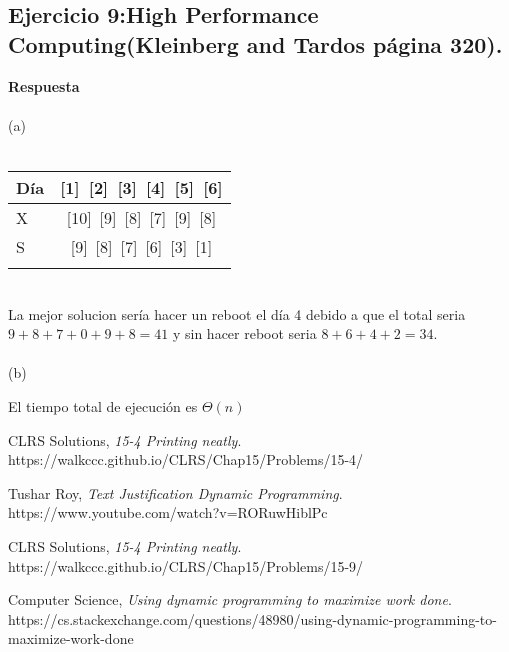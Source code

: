 \documentclass[a4paper,12pt]{article}
\begin{document}
\subsection{Ejercicio 9:High Performance Computing(Kleinberg and Tardos página 320).}
\textbf{Respuesta}\\\\
(a)\\\\
\begin{tabular}{lc}
\hline \hline
 Día & \mbox{[1] [2] [3] [4] [5] [6]} \\\hline
 X & \mbox{[10] [9] [8] [7] [9] [8]}\\
 S & \mbox{[9] [8] [7] [6] [3] [1]}\\
\\
\hline \hline
\end{tabular}\\
La mejor solucion sería hacer un reboot el día 4 debido a que el total seria $9 + 8 + 7 + 0 + 9 + 8 = 41$ y sin hacer reboot seria $8 + 6 + 4 + 2 = 34 $.\\\\
(b)

El tiempo total de ejecución es $\Theta(n)$
\clearpage
\begin{thebibliography}{15}

  CLRS Solutions,
  \emph{15-4 Printing neatly}.\\
  https://walkccc.github.io/CLRS/Chap15/Problems/15-4/

  Tushar Roy,
  \emph{Text Justification Dynamic Programming}.\\
  https://www.youtube.com/watch?v=RORuwHiblPc
  
  CLRS Solutions,
  \emph{15-4 Printing neatly}.\\
  https://walkccc.github.io/CLRS/Chap15/Problems/15-9/

  Computer Science,
  \emph{Using dynamic programming to maximize work done}.\\
  https://cs.stackexchange.com/questions/48980/using-dynamic-programming-to-maximize-work-done

\end{thebibliography}

\end{document}
